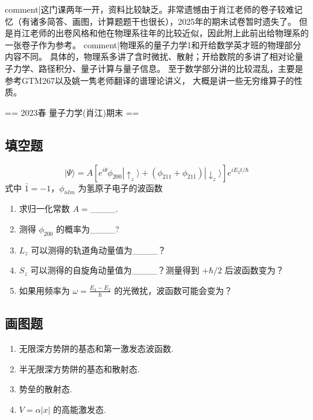 
{{comment|这门课两年一开，资料比较缺乏。非常遗憾由于肖江老师的卷子较难记忆（有诸多简答、画图，计算题题干也很长），2025年的期末试卷暂时遗失了。
但是肖江老师的出卷风格和他在物理系往年的比较近似，因此附上此前出给物理系的一张卷子作为参考。}}
{{comment|物理系的量子力学1和开给数学英才班的物理部分内容不同。
具体的，物理系多讲了含时微扰、散射；开给数院的多讲了相对论量子力学、路径积分、量子计算与量子信息。
至于数学部分讲的比较混乱，主要是参考GTM267以及姚一隽老师翻译的谱理论讲义，
大概是讲一些无穷维算子的性质。}}



== 2023春 量子力学(肖江)期末 ==
\subsection*{填空题}

\begin{equation*}
|\Psi\rangle = A[e^{i\theta}\phi_{200}|\uparrow_z\rangle + (\phi_{211} + \phi_{21\bar{1}})|\downarrow_z\rangle]e^{iE_2t/\hbar}
\end{equation*}
式中 $\bar{1} = -1$，$\phi_{nlm}$ 为氢原子电子的波函数

\begin{enumerate}
    \item 求归一化常数 $A =$____.
    \item 测得 $\phi_{200}$ 的概率为____?
    \item $L_z$ 可以测得的轨道角动量值为____？
    \item $S_z$ 可以测得的自旋角动量值为____？测量得到 $+\hbar/2$ 后波函数变为？
    \item 如果用频率为 $\omega = \frac{E_3-E_2}{\hbar}$ 的光微扰，波函数可能会变为？
\end{enumerate}

\subsection*{画图题}

\begin{enumerate}
    \item 无限深方势阱的基态和第一激发态波函数.
    \item 半无限深方势阱的基态和散射态.
    \item 势垒的散射态.
    \item $V = \alpha|x|$ 的高能激发态.
\end{enumerate}

